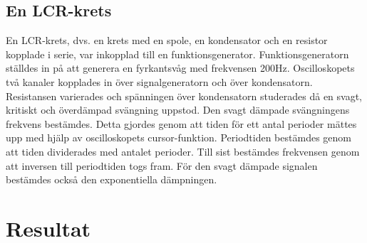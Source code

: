 \documentclass[a4paper,10pt]{article}
\begin{document}
\subsection{En LCR-krets}
En LCR-krets, dvs. en krets med en spole, en kondensator och en resistor kopplade i serie, var inkopplad till en funktionsgenerator. Funktionsgeneratorn ställdes in på att generera en fyrkantsvåg med frekvensen 200Hz. Oscilloskopets två kanaler kopplades in över signalgeneratorn och över kondensatorn.
\\

Resistansen varierades och spänningen över kondensatorn studerades då en svagt, kritiskt och överdämpad svängning uppstod. Den svagt dämpade svängningens frekvens bestämdes. Detta gjordes genom att tiden för ett antal perioder mättes upp med hjälp av oscilloskopets cursor-funktion. Periodtiden bestämdes genom att tiden dividerades med antalet perioder. Till sist bestämdes frekvensen genom att inversen till periodtiden togs fram. För den svagt dämpade signalen bestämdes också den exponentiella dämpningen.

\section{Resultat}
\end{document}
